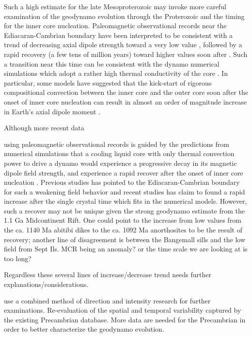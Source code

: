 \documentclass[draft]{agujournal2019}
\begin{document}
Such a high estimate for the late Mesoproterozoic may invoke more careful examination of the geodynamo evolution through the Proterozoic and the timing for the inner core nucleation. Paleomagnetic observational records near the Ediacaran-Cambrian boundary have been interpreted to be consistent with a trend of decreasing axial dipole strength toward a very low value \cite{Lloyd2021a, Bono2019a}, followed by a rapid recovery (a few tens of million years) toward higher values soon after \cite{Thallner2021a}. Such a transition near this time can be consistent with the dynamo numerical simulations which adopt a rather high thermal conductivity of the core \cite{Davies2021a}. In particular, some models have suggested that the kick-start of rigorous compositional convection between the inner core and the outer core soon after the onset of inner core nucleation can result in almost an order of magnitude increase in Earth's axial dipole moment \cite{Davies2021a}. 

Although more recent data 

using paleomagnetic observational records is guided by the predictions from numerical simulations that a cooling liquid core with only thermal convection power to drive a dynamo would experience a progressive decay in its magnetic dipole field strength, and experience a rapid recover after the onset of inner core nucleation \cite{Davies2021a}. Previous studies has pointed to the Ediacaran-Cambrian boundary for such a weakening field behavior and recent studies has claim to found a rapid increase after the single crystal time which fits in the numerical models. However, such a recover may not be unique given the strong geodynamo estimate from the 1.1 Ga Midcontinent Rift. One could point to the increase from low values from the ca. 1140 Ma abitibi dikes to the ca. 1092 Ma anorthosites to be the result of recovery; another line of disagreement is between the Bangemall sills and the low field from Sept Ils. MCR being an anomaly? or the time scale we are looking at is too long?

Regardless these several lines of increase/decrease trend needs further explanations/considerations. 

use a combined method of direction and intensity research for further examinations. Re-evaluation of the spatial and temporal variability captured by the existing Precambrian database. More data are needed for the Precambrian in order to better characterize the geodynamo evolution. 
\end{document}
